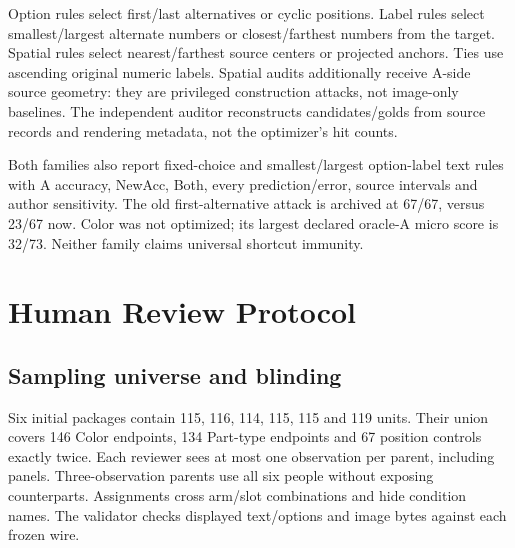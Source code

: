 \documentclass[10pt,twocolumn,letterpaper]{article}
\begin{document}
\begin{table}[H]
\centering\small
\caption{All 13 declared Part-type oracle-A attacks, B accuracy (\%).
A is supplied correctly, so NewAcc=Both. Each rule excludes the
A-matching candidate and never reads B. Source intervals are descriptive
after design optimization, not out-of-sample guarantees.}
\label{tab:shortcuts}
\setlength{\tabcolsep}{3pt}

\end{table}

Option rules select first/last alternatives or cyclic positions.
Label rules select smallest/largest alternate numbers or closest/farthest
numbers from the target. Spatial rules select nearest/farthest source
centers or projected anchors. Ties use ascending original numeric labels.
Spatial audits additionally receive A-side source geometry:
they are privileged construction attacks, not image-only baselines.
The independent auditor reconstructs candidates/golds from source
records and rendering metadata, not the optimizer's hit counts.

Both families also report fixed-choice and smallest/largest option-label
text rules with A accuracy, NewAcc, Both, every prediction/error,
source intervals and author sensitivity. The old first-alternative attack
is archived at 67/67, versus 23/67 now. Color was not optimized; its
largest declared oracle-A micro score is 32/73. Neither family claims
universal shortcut immunity.

\begin{table}[!t]
\centering\small
\caption{All source assemblies. Band is source scale. Color and
Part-type count primary parents, each contributing exactly one A/B
pair. All 24 sources appear in both visual families; variants do not
increase source count.}
\label{tab:sources}

\end{table}

\section{Human Review Protocol}
\subsection{Sampling universe and blinding}
Six initial packages contain 115, 116, 114, 115, 115 and 119 units.
Their union covers 146 Color endpoints, 134 Part-type endpoints and
67 position controls exactly twice. Each reviewer sees at most one
observation per parent, including panels. Three-observation parents
use all six people without exposing counterparts. Assignments cross
arm/slot combinations and hide condition names. The validator checks
displayed text/options and image bytes against each frozen wire.
\end{document}
